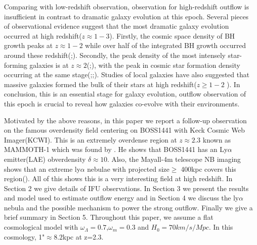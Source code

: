 \documentclass[../main.tex]{subfiles}
\begin{document}
Comparing with low-redshift observation, observation for high-redshift outflow is insufficient in contrast to dramatic galaxy evolution at this epoch. Several pieces of observational evidence suggest that the most dramatic galaxy evolution occurred at high redshift($z \approx 1-3$). Firstly, the cosmic space density of BH growth peaks at $z \approx 1-2$ while over half of the integrated BH growth occurred around these redshift(\cite{schmidt1983quasar};\cite{richards2006sloan}). Secondly, the peak density of the most intensely star-forming galaxies is at $z \approx 2$(\cite{chapman2005redshift};\cite{wardlow2011laboca}), with the peak in cosmic star formation density occurring at the same stage(\cite{madau1996high};\cite{lilly1999canada};\cite{madau2014cosmic}). Studies of local galaxies have also suggested that massive galaxies formed the bulk of their stars at high redshift($z \geqslant 1-2$ ). In conclusion, this is an essential stage for galaxy evolution, outflow observation of this epoch is crucial to reveal how galaxies co-evolve with their environments. 

Motivated by the above reasons, in this paper we report a follow-up observation on the famous overdensity field centering on BOSS1441 with Keck Cosmic Web Imager(KCWI). This is an extremely overdense region at $z \approx 2.3$ known as MAMMOTH-1 which was found by \cite{cai2015mapping}. He shows that BOSS1441 has an Ly$\alpha$ emitter(LAE) obverdensity $\delta \approx 10$. Also, the Mayall-4m telescope NB imaging shows that an extreme ly$\alpha$ nebulae with projected size$\geqslant$ 400kpc covers this region(\cite{cai2017discovery}). All of this shows this is a very interesting field at high redshift. In Section 2 we give details of IFU observations. In Section 3 we present the results and model used to estimate outflow energy and in Section 4 we discuss the ly$\alpha$ nebula and the possible mechanism to power the strong outflow. Finally we give a brief summary in Section 5. Throughout this paper, we assume a flat cosmological model with $\omega_{\Lambda}=0.7$,$\omega_{m}=0.3$ and $H_{0}=70 km/s/Mpc$. In this cosmology, 1"$ \approx 8.2$kpc at z=2.3.



















\end{document}
